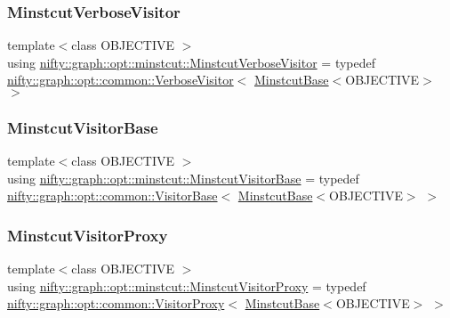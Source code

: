\subsubsection{\texorpdfstring{Minstcut\+Verbose\+Visitor}{MinstcutVerboseVisitor}}
{\footnotesize\ttfamily template$<$class O\+B\+J\+E\+C\+T\+I\+VE $>$ \\
using \hyperlink{namespacenifty_1_1graph_1_1opt_1_1minstcut_aa168742d4d2935e1348ea4b866f3ae09}{nifty\+::graph\+::opt\+::minstcut\+::\+Minstcut\+Verbose\+Visitor} = typedef \hyperlink{classnifty_1_1graph_1_1opt_1_1common_1_1VerboseVisitor}{nifty\+::graph\+::opt\+::common\+::\+Verbose\+Visitor}$<$ \hyperlink{classnifty_1_1graph_1_1opt_1_1minstcut_1_1MinstcutBase}{Minstcut\+Base}$<$O\+B\+J\+E\+C\+T\+I\+VE$>$ $>$}

\mbox{\label{namespacenifty_1_1graph_1_1opt_1_1minstcut_a42d7fa14edf7c8f367a49541f392e5aa}} 
\subsubsection{\texorpdfstring{Minstcut\+Visitor\+Base}{MinstcutVisitorBase}}
{\footnotesize\ttfamily template$<$class O\+B\+J\+E\+C\+T\+I\+VE $>$ \\
using \hyperlink{namespacenifty_1_1graph_1_1opt_1_1minstcut_a42d7fa14edf7c8f367a49541f392e5aa}{nifty\+::graph\+::opt\+::minstcut\+::\+Minstcut\+Visitor\+Base} = typedef \hyperlink{classnifty_1_1graph_1_1opt_1_1common_1_1VisitorBase}{nifty\+::graph\+::opt\+::common\+::\+Visitor\+Base}$<$ \hyperlink{classnifty_1_1graph_1_1opt_1_1minstcut_1_1MinstcutBase}{Minstcut\+Base}$<$O\+B\+J\+E\+C\+T\+I\+VE$>$ $>$}

\mbox{\label{namespacenifty_1_1graph_1_1opt_1_1minstcut_a50858becd7b1ba218be1797c92e3a947}} 
\subsubsection{\texorpdfstring{Minstcut\+Visitor\+Proxy}{MinstcutVisitorProxy}}
{\footnotesize\ttfamily template$<$class O\+B\+J\+E\+C\+T\+I\+VE $>$ \\
using \hyperlink{namespacenifty_1_1graph_1_1opt_1_1minstcut_a50858becd7b1ba218be1797c92e3a947}{nifty\+::graph\+::opt\+::minstcut\+::\+Minstcut\+Visitor\+Proxy} = typedef \hyperlink{classnifty_1_1graph_1_1opt_1_1common_1_1VisitorProxy}{nifty\+::graph\+::opt\+::common\+::\+Visitor\+Proxy}$<$ \hyperlink{classnifty_1_1graph_1_1opt_1_1minstcut_1_1MinstcutBase}{Minstcut\+Base}$<$O\+B\+J\+E\+C\+T\+I\+VE$>$ $>$}

